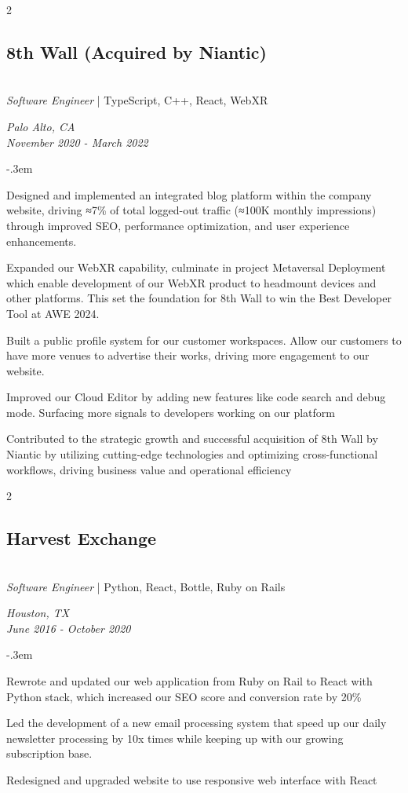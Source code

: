 \documentclass{article}
\let\olditemize=\itemize \let\endolditemize=\enditemize
\renewenvironment{itemize}{\olditemize[topsep=0em] \itemsep-.3em}{\endolditemize}
\newenvironment{twocolentry}[2][]{
    \def\secondColumn{#2}
    \raggedright
    \setcolumnwidth{\fill, 6cm}
    \begin{paracol}{2}
}{
    \switchcolumn \raggedleft \secondColumn
    \end{paracol}
} %
\begin{document}
\begin{twocolentry}{
  \textit{Palo Alto, CA} \\
  \textit{November 2020 - March 2022}
}
\subsection{8th Wall (Acquired by Niantic)}\hfill\\
\textit{Software Engineer} | TypeScript, C++, React, WebXR
\end{twocolentry}
\begin{itemize}
  \item Designed and implemented an integrated blog platform within the company website, driving
  ≈7\% of total logged-out traffic (≈100K monthly impressions) through improved SEO, performance
  optimization, and user experience enhancements.
  \item Expanded our WebXR capability, culminate in project Metaversal Deployment which enable
  development of our WebXR product to headmount devices and other platforms. This set the foundation
  for 8th Wall to win the Best Developer Tool at AWE 2024.
  \item Built a public profile system for our customer workspaces. Allow our customers to have more
  venues to advertise their works, driving more engagement to our website. 
  \item Improved our Cloud Editor by adding new features like code search and debug mode. Surfacing
  more signals to developers working on our platform
  \item Contributed to the strategic growth and successful acquisition of 8th Wall by Niantic by
  utilizing cutting-edge technologies and optimizing cross-functional workflows, driving business
  value and operational efficiency
\end{itemize}

\begin{twocolentry}{
  \textit{Houston, TX} \\
  \textit{June 2016 - October 2020} \\
}
\subsection{Harvest Exchange}\hfill\\
\textit{Software Engineer} | Python, React, Bottle, Ruby on Rails
\end{twocolentry}
\begin{itemize}
  \item Rewrote and updated our web application from Ruby on Rail to React with Python stack, which
  increased our SEO score and conversion rate by 20\%
  \item Led the development of a new email processing system that speed up our daily newsletter
  processing by 10x times while keeping up with our growing subscription base.
  \item Redesigned and upgraded website to use responsive web interface with React
\end{itemize}
\end{document}
